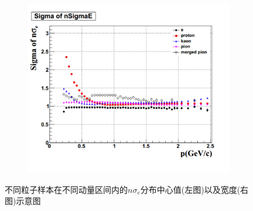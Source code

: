 \begin{figure}[h!]
\begin{subfigure}[h!]{0.45\textwidth}
            \includegraphics[width=\textwidth]{figures/Chapter4/Sigma_PureSample.png}
            \caption{}
            \label{fig:Sigma_PureSample}
    \end{subfigure}
    \caption[不同粒子样本在不同动量区间内的$n\sigma_{e}$分布中心值以及宽度示意图]{不同粒子样本在不同动量区间内的$n\sigma_{e}$分布中心值(左图)以及宽度(右图)示意图}
    \label{fig:MeanAndSigma_puresample}
\end{figure}

